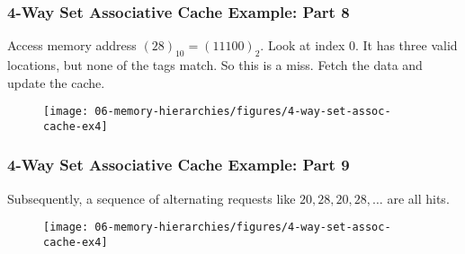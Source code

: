 {\begin{frame}
\end{frame}

\begin{frame}\frametitle{4-Way Set Associative Cache Example: Part 8}
Access memory address $(28)_{10}=(11100)_2$. Look at index 0. It has three valid locations, but none of the tags match. So this is a miss. Fetch the data and update the cache. 
\begin{figure}[H]
\centering
{\texttt{[image: 06-memory-hierarchies/figures/4-way-set-assoc-cache-ex4]}}
\end{figure}

\end{frame}

\newpage
\begin{frame}\frametitle{4-Way Set Associative Cache Example: Part 9}
Subsequently, a sequence of alternating requests like $20, 28, 20, 28, \dots$ are all hits.
\begin{figure}[H]
\centering
{\texttt{[image: 06-memory-hierarchies/figures/4-way-set-assoc-cache-ex4]}}
\end{figure}

\end{frame}
}\fi


